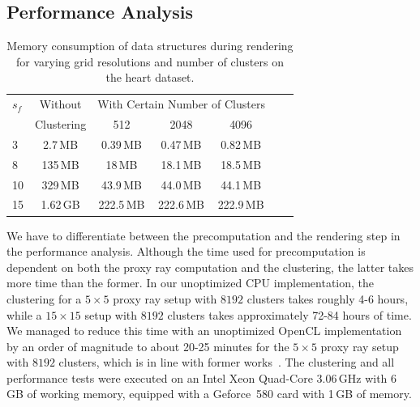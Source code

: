 \documentclass[journal]{vgtc}                %
\newcommand{\todo}[1]{\textbf{\textcolor{blue}{[TODO: {#1}]}}}
\begin{document}
%
%
%
\subsection{Performance Analysis}\label{subsec:performance}
\begin{table}[b]
  \caption{Memory consumption of data structures during rendering for varying grid resolutions and number of clusters on the heart dataset.}
  \label{tab:data_size}
  \begin{center}
    \begin{tabular}{|l|c|c|c|c|c|c|}
      \hline
      $s_f$ &  Without & \multicolumn{3}{c|}{With Certain Number of Clusters}\\
      	       & Clustering & 512 & 2048 & 4096\\
      \hline
      3	&	 2.7\,MB	&	0.39\,MB		&	0.47\,MB	&	0.82\,MB  \\
      8 	&	135\,MB	&	18\,MB		&	18.1\,MB	&	18.5\,MB	\\
      10 	&	329\,MB	&	43.9\,MB		&	44.0\,MB	&	44.1\,MB	\\
      15	&	1.62\,GB	&	222.5\,MB		&	222.6\,MB	&	222.9\,MB \\
      \hline
    \end{tabular}
  \end{center}
\end{table}

We have to differentiate between the precomputation and the rendering step in the performance analysis. Although the time used for precomputation is dependent on both the proxy ray computation and the clustering, the latter takes more time than the former. In our unoptimized CPU implementation, the clustering for a $5\times5$ proxy ray setup with $8192$ clusters takes roughly 4-6 hours, while a $15\times15$ setup with $8192$ clusters takes approximately 72-84 hours of time. We managed to reduce this time with an unoptimized OpenCL implementation by an order of magnitude to about 20-25 minutes for the $5\times5$ proxy ray setup with $8192$ clusters, which is in line with former works~\cite{mess10gpuclustering}. The clustering and all performance tests were executed on an Intel Xeon Quad-Core 3.06\,GHz with 6\,GB of working memory, equipped with a Geforce~580 card with 1\,GB of memory.
\end{document}
